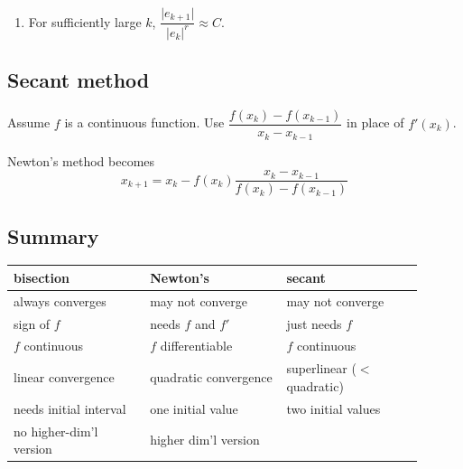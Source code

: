\documentclass[12pt,letterpaper,noanswers]{exam}
\begin{document}
\begin{enumerate}[resume]
\item For sufficiently large $k$, $\dfrac{\vert e_{k+1}\vert}{\vert e_k\vert^r} \approx C$.
\end{enumerate}


\subsection*{Secant method}
\begin{tcolorbox}
Assume $f$ is a continuous function.  Use $\dfrac{f(x_k)-f(x_{k-1})}{x_k-x_{k-1}}$ in place of $f'(x_{k})$.  

Newton's method becomes \[x_{k+1} = x_k - f(x_k)\dfrac{x_k-x_{k-1}}{f(x_k) - f(x_{k-1})}\]
\end{tcolorbox}

\subsection*{Summary}
\begin{tabular}{p{0.3\linewidth} p{0.3\linewidth} p{0.3\linewidth}}
bisection & Newton's & secant \\
\hline
always converges & may not converge & may not converge\\
sign of $f$  & needs $f$ and $f'$ & just needs $f$ \\
$f$ continuous & $f$ differentiable & $f$ continuous\\
linear convergence & quadratic convergence & superlinear ($<$ quadratic) \\
needs initial interval & one initial value& two initial values\\
no higher-dim'l version & higher dim'l version & \\
\end{tabular}
\end{document}
